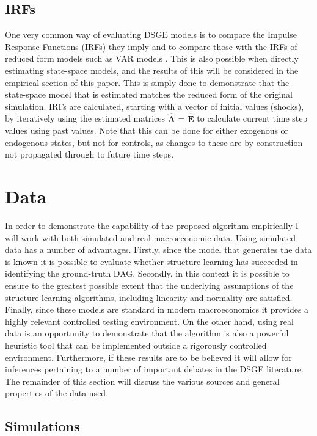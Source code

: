\documentclass{article}
\begin{document}
\subsection{IRFs}

One very common way of evaluating DSGE models is to compare the Impulse Response Functions (IRFs) they imply and to compare those with the IRFs of reduced form models such as VAR models \parencite[p.83]{ramey2016handbook}. This is also possible when directly estimating state-space models, and the results of this will be considered in the empirical section of this paper. This is simply done to demonstrate that the state-space model that is estimated matches the reduced form of the original simulation. IRFs are calculated, starting with a vector of initial values (shocks), by iteratively using the estimated matrices $\hat{\mathbf{A}}$ = $\hat{\mathbf{E}}$ to calculate current time step values using past values. Note that this can be done for either exogenous or endogenous states, but not for controls, as changes to these are by construction not propagated through to future time steps.

\section{Data} \label{data}

In order to demonstrate the capability of the proposed algorithm empirically I will work with both simulated and real macroeconomic data. Using simulated data has a number of advantages. Firstly, since the model that generates the data is known it is possible to evaluate whether structure learning has succeeded in identifying the ground-truth DAG. Secondly, in this context it is possible to ensure to the greatest possible extent that the underlying assumptions of the structure learning algorithms, including linearity and normality are satisfied. Finally, since these models are standard in modern macroeconomics it provides a highly relevant controlled testing environment. On the other hand, using real data is an opportunity to demonstrate that the algorithm is also a powerful heuristic tool that can be implemented outside a rigorously controlled environment. Furthermore, if these results are to be believed it will allow for inferences pertaining to a number of important debates in the DSGE literature. The remainder of this section will discuss the various sources and general properties of the data used.

\subsection{Simulations}
\end{document}
